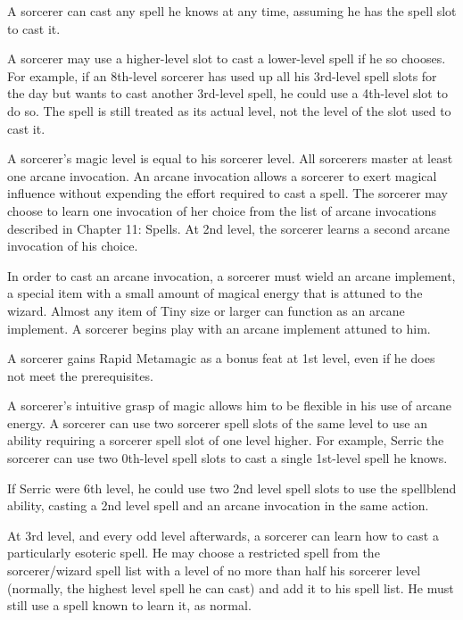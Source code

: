 \par A sorcerer can cast any spell he knows at any time, assuming he has the spell slot to cast it.

\par A sorcerer may use a higher-level slot to cast a lower-level spell if he so chooses. For example, if an 8th-level sorcerer has used up all his 3rd-level spell slots for the day but wants to cast another 3rd-level spell, he could use a 4th-level slot to do so. The spell is still treated as its actual level, not the level of the slot used to cast it.

A sorcerer's magic level is equal to his sorcerer level.
 All sorcerers master at least one arcane invocation. An arcane invocation allows a sorcerer to exert magical influence without expending the effort required to cast a spell. The sorcerer may choose to learn one invocation of her choice from the list of arcane invocations described in Chapter 11: Spells. At 2nd level, the sorcerer learns a second arcane invocation of his choice.

In order to cast an arcane invocation, a sorcerer must wield an arcane implement, a special item with a small amount of magical energy that is attuned to the wizard. Almost any item of Tiny size or larger can function as an arcane implement. A sorcerer begins play with an arcane implement attuned to him.

 A sorcerer gains Rapid Metamagic as a bonus feat at 1st level, even if he does not meet the prerequisites.

 A sorcerer's intuitive grasp of magic allows him to be flexible in his use of arcane energy. A sorcerer can use two sorcerer spell slots of the same level to use an ability requiring a sorcerer spell slot of one level higher. For example, Serric the sorcerer can use two 0th-level spell slots to cast a single 1st-level spell he knows.

If Serric were 6th level, he could use two 2nd level spell slots to use the spellblend ability, casting a 2nd level spell and an arcane invocation in the same action.

 At 3rd level, and every odd level afterwards, a sorcerer can learn how to cast a particularly esoteric spell. He may choose a restricted spell from the sorcerer/wizard spell list with a level of no more than half his sorcerer level (normally, the highest level spell he can cast) and add it to his spell list. He must still use a spell known to learn it, as normal.

